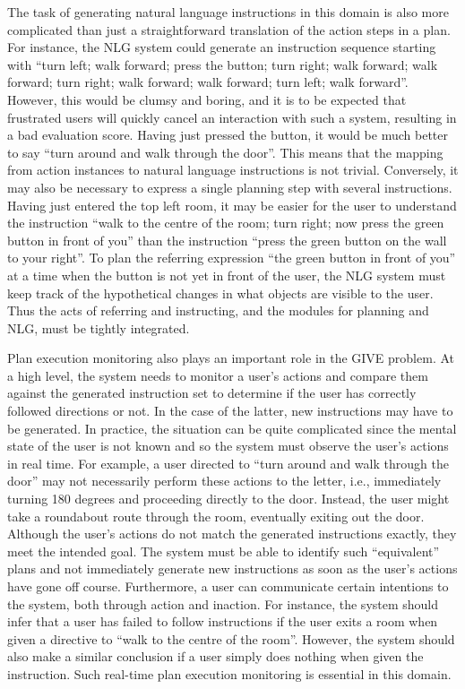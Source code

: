 The task of generating natural language instructions in this domain is also
more complicated than just a straightforward translation of the action
steps in a plan. For instance, the NLG system could generate an instruction
sequence starting with ``turn left; walk forward; press the button; turn
right; walk forward; walk forward; turn right; walk forward; walk forward;
turn left; walk forward''.  However, this would be clumsy and boring, and
it is to be expected that frustrated users will quickly cancel an
interaction with such a system, resulting in a bad evaluation score.
Having just pressed the button, it would be much better to say ``turn
around and walk through the door''.  This means that the mapping from
action instances to natural language instructions is not trivial.
Conversely, it may also be necessary to express a single planning step with
several instructions.  Having just entered the top left room, it may be
easier for the user to understand the instruction ``walk to the centre of
the room; turn right; now press the green button in front of you'' than the
instruction ``press the green button on the wall to your right''.  To plan
the referring expression ``the green button in front of you'' at a time
when the button is not yet in front of the user, the NLG system must keep
track of the hypothetical changes in what objects are visible to the user.
Thus the acts of referring and instructing, and the modules for planning
and NLG, must be tightly integrated.

Plan execution monitoring also plays an important role in the GIVE problem.
At a high level, the system needs to monitor a user's actions and compare
them against the generated instruction set to determine if the user has
correctly followed directions or not. In the case of the latter, new
instructions may have to be generated. In practice, the situation
can be quite complicated since the mental state of the user is not known
and so the system must observe the user's actions in real time. For
example, a user directed to ``turn around and walk through the door'' may
not necessarily perform these actions to the letter, i.e., immediately
turning 180 degrees and proceeding directly to the door. Instead, the user
might take a roundabout route through the room, eventually exiting out the
door. Although the user's actions do not match the generated instructions
exactly, they meet the intended goal. The system must be able to identify
such ``equivalent'' plans and not immediately generate new instructions as
soon as the user's actions have gone off course. Furthermore, a user can
communicate certain intentions to the system, both through action and
inaction. For instance, the system should infer that a user has failed to
follow instructions if the user exits a room when given a directive to
``walk to the centre of the room''. However, the system should also make a
similar conclusion if a user simply does nothing when given the
instruction. Such real-time plan execution monitoring is essential in this
domain.

